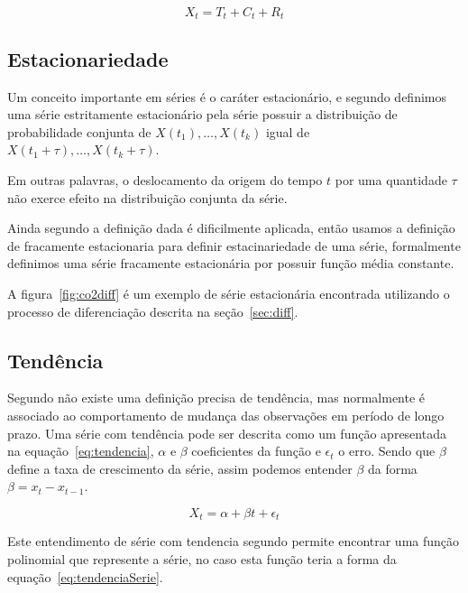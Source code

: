\documentclass[
	12pt,
	oneside,
	a4paper,
	english,
	brazil
]{abntex2}
\begin{document}
\begin{equation}
	\label{eq:timeseries}
	X_t = T_t + C_t + R_t
\end{equation}

\subsection{Estacionariedade}

Um conceito importante em séries é o caráter estacionário, e segundo 
 definimos uma série estritamente estacionário pela série 
possuir a distribuição de probabilidade conjunta de $X(t_1), \ldots, X(t_k)$ 
igual de $X(t_1 + \tau), \ldots, X(t_k + \tau)$.

Em outras palavras, o deslocamento da origem do tempo $t$ por uma quantidade 
$\tau$ não exerce efeito na distribuição conjunta da série.

Ainda segundo  a definição dada é dificilmente aplicada, 
então usamos a definição de fracamente estacionaria para definir estacinariedade 
de uma série, formalmente definimos uma série fracamente estacionária por 
possuir função média constante.

A figura~\ref{fig:co2diff} é um exemplo de série estacionária encontrada 
utilizando o processo de diferenciação descrita na seção~\ref{sec:diff}.

\subsection{Tendência}

Segundo  não existe uma definição precisa de tendência, mas 
normalmente é associado ao comportamento de mudança das observações em período 
de longo prazo. Uma série com tendência pode ser descrita como um função 
apresentada na equação~\ref{eq:tendencia}, $\alpha$ e $\beta{}$ coeficientes da 
função e $\epsilon{}_t$ o erro. Sendo que $\beta{}$ define a taxa de crescimento 
da série, assim podemos entender $\beta$ da forma $\beta = x_t - x_{t-1}$.

\begin{equation}
	\label{eq:tendencia}
	X_t = \alpha + \beta{}t + \epsilon{}_t
\end{equation}

Este entendimento de série com tendencia segundo  permite 
encontrar uma função polinomial que represente a série, no caso esta função 
teria a forma da equação~\ref{eq:tendenciaSerie}.
\end{document}
